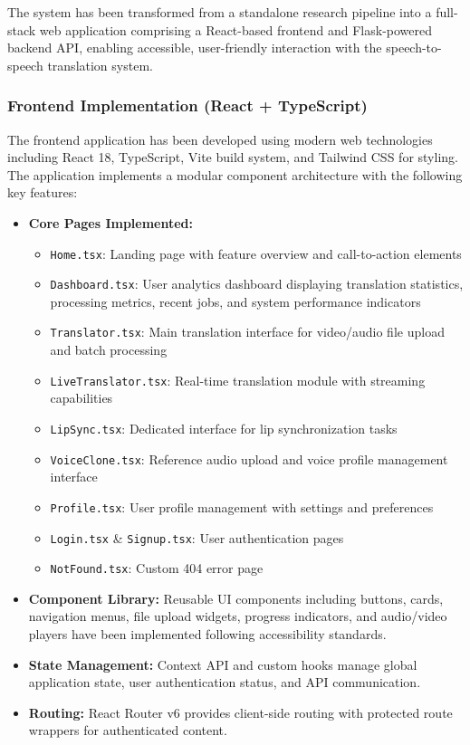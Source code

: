 \documentclass[12pt,oneside]{report}
\begin{document}
The system has been transformed from a standalone research pipeline into a full-stack web application comprising a React-based frontend and Flask-powered backend API, enabling accessible, user-friendly interaction with the speech-to-speech translation system.

\subsubsection{Frontend Implementation (React + TypeScript)}

The frontend application has been developed using modern web technologies including React 18, TypeScript, Vite build system, and Tailwind CSS for styling. The application implements a modular component architecture with the following key features:

\begin{itemize}
    \item \textbf{Core Pages Implemented:}
    \begin{itemize}
        \item \texttt{Home.tsx}: Landing page with feature overview and call-to-action elements
        \item \texttt{Dashboard.tsx}: User analytics dashboard displaying translation statistics, processing metrics, recent jobs, and system performance indicators
        \item \texttt{Translator.tsx}: Main translation interface for video/audio file upload and batch processing
        \item \texttt{LiveTranslator.tsx}: Real-time translation module with streaming capabilities
        \item \texttt{LipSync.tsx}: Dedicated interface for lip synchronization tasks
        \item \texttt{VoiceClone.tsx}: Reference audio upload and voice profile management interface
        \item \texttt{Profile.tsx}: User profile management with settings and preferences
        \item \texttt{Login.tsx} \& \texttt{Signup.tsx}: User authentication pages
        \item \texttt{NotFound.tsx}: Custom 404 error page
    \end{itemize}
    
    \item \textbf{Component Library:} Reusable UI components including buttons, cards, navigation menus, file upload widgets, progress indicators, and audio/video players have been implemented following accessibility standards.
    
    \item \textbf{State Management:} Context API and custom hooks manage global application state, user authentication status, and API communication.
    
    \item \textbf{Routing:} React Router v6 provides client-side routing with protected route wrappers for authenticated content.
\end{itemize}
\end{document}
